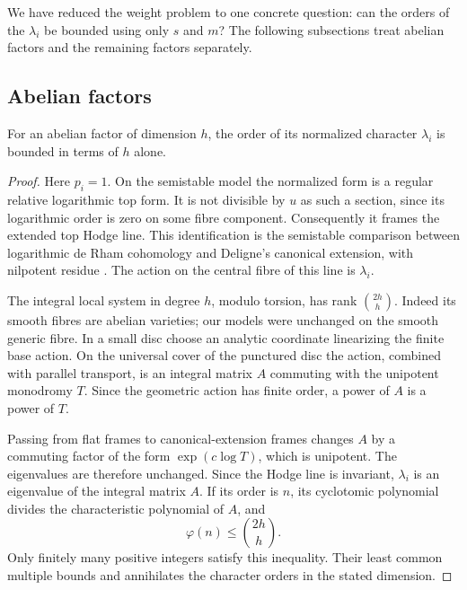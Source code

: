 We have reduced the weight problem to one concrete question:
can the orders of the $\lambda_i$ be bounded using only $s$ and $m$?
The following subsections treat abelian factors and the remaining
factors separately.

\subsection{Abelian factors}

\begin{lemma}\label{lem:abelian-character}
For an abelian factor of dimension $h$, the order of its normalized
character $\lambda_i$ is bounded in terms of $h$ alone.
\end{lemma}

\begin{proof}
Here $p_i=1$. On the semistable model the normalized form is a regular
relative logarithmic top form. It is not divisible by $u$ as such a
section, since its logarithmic order is zero on some fibre component.
Consequently it frames the extended top Hodge line. This identification
is the semistable comparison between logarithmic de Rham cohomology
and Deligne's canonical extension, with nilpotent residue
\cite{Deligne,Steenbrink}. The action on the central fibre of this line
is $\lambda_i$.

The integral local system in degree $h$, modulo torsion, has rank
$\binom{2h}{h}$. Indeed its smooth fibres are abelian varieties; our
models were unchanged on the smooth generic fibre. In a small disc
choose an analytic coordinate linearizing the finite base action.
On the universal cover of the punctured disc the action, combined
with parallel transport, is an integral matrix $A$ commuting with
the unipotent monodromy $T$. Since the geometric action has finite
order, a power of $A$ is a power of $T$.

Passing from flat frames to canonical-extension frames changes $A$
by a commuting factor of the form $\exp(c\log T)$, which is unipotent.
The eigenvalues are therefore unchanged. Since the Hodge line is
invariant, $\lambda_i$ is an eigenvalue of the integral matrix $A$.
If its order is $n$, its cyclotomic polynomial divides the
characteristic polynomial of $A$, and
\[
                         \varphi(n)\leq\binom{2h}{h}.
\]
Only finitely many positive integers satisfy this inequality.
Their least common multiple bounds and annihilates the character
orders in the stated dimension.
\end{proof}

